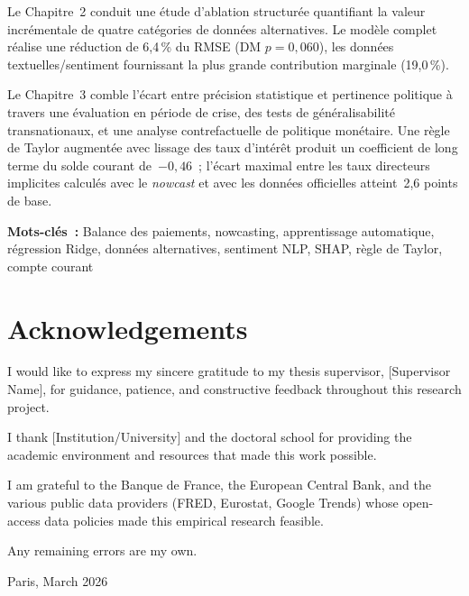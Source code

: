 \documentclass[12pt,a4paper,twoside]{report}
\begin{document}
Le Chapitre~2 conduit une étude d'ablation structurée quantifiant la valeur incrémentale de quatre catégories de données alternatives.  Le modèle complet réalise une réduction de 6{,}4\,\% du RMSE (DM $p = 0{,}060$), les données textuelles/sentiment fournissant la plus grande contribution marginale (19{,}0\,\%).

Le Chapitre~3 comble l'écart entre précision statistique et pertinence politique à travers une évaluation en période de crise, des tests de généralisabilité transnationaux, et une analyse contrefactuelle de politique monétaire.  Une règle de Taylor augmentée avec lissage des taux d'intérêt produit un coefficient de long terme du solde courant de~$-0{,}46$~; l'écart maximal entre les taux directeurs implicites calculés avec le \emph{nowcast} et avec les données officielles atteint~2{,}6 points de base.

\medskip
\noindent\textbf{Mots-clés~:} Balance des paiements, nowcasting, apprentissage automatique, régression Ridge, données alternatives, sentiment NLP, SHAP, règle de Taylor, compte courant

\chapter*{Acknowledgements}

I would like to express my sincere gratitude to my thesis supervisor, [Supervisor Name], for guidance, patience, and constructive feedback throughout this research project.

I thank [Institution/University] and the doctoral school for providing the academic environment and resources that made this work possible.

I am grateful to the Banque de France, the European Central Bank, and the various public data providers (FRED, Eurostat, Google Trends) whose open-access data policies made this empirical research feasible.

Any remaining errors are my own.

\vspace{2cm}
\hfill Paris, March 2026


\tableofcontents
\newpage
\listoftables
\listoffigures
\newpage








\appendix


\printbibliography[heading=bibintoc, title={References}]
\end{document}
